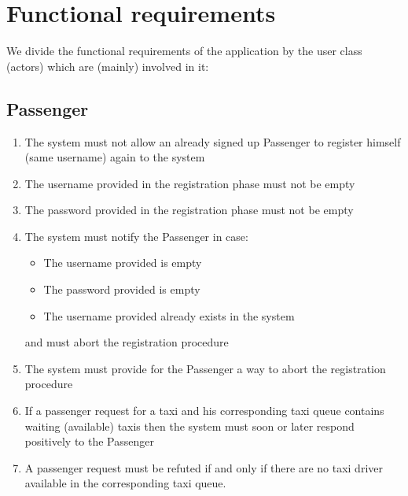 \section{Functional requirements}
We divide the functional requirements of the application by the user class (actors) which are (mainly) involved in it:
\subsection{Passenger}
\begin{enumerate}
\item The system must not allow an already signed up Passenger to register himself (same username) again to the system
\item The username provided in the registration phase must not be empty
\item The password provided in the registration phase must not be empty
\item The system must notify the Passenger in case: 
	\begin{itemize}
	\item The username provided is empty
	\item The password provided is empty
	\item The username provided already exists in the system
	\end{itemize}
	and must abort the registration procedure
\item The system must provide for the Passenger a way to abort the registration procedure
\item If a passenger request for a taxi and his corresponding taxi queue contains waiting (available) taxis then the system must soon or later respond positively to the Passenger
\item A passenger request must be refuted if and only if there are no taxi driver available in the corresponding taxi queue.
\end{enumerate}


